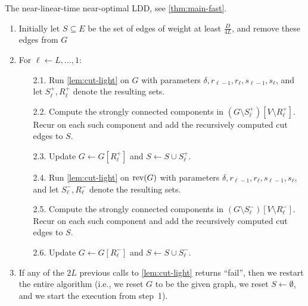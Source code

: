 \documentclass[letterpaper,11pt]{article}
\begin{document}
\begin{algorithm}[t]
\caption{The near-linear-time near-optimal LDD, see \cref{thm:main-fast}.} \label{alg:ldd-fast}
\begin{enumerate}
    \item Initially let $S \subseteq E$ be the set of edges of weight at least $\frac{D}{4L}$, and remove these edges from $G$
    \item For $\ell \gets L, \dots, 1$:
    \begin{enumerate}
        \item[2.1.] Run \cref{lem:cut-light} on $G$ with parameters $\delta, r_{\ell-1}, r_\ell, s_{\ell-1}, s_{\ell}$, and let $S^+_\ell, R^+_\ell$ denote the resulting sets.
        \item[2.2.] Compute the strongly connected components in $(G \setminus S^+_\ell)[V \setminus R^+_\ell]$. Recur on each such component and add the recursively computed cut edges to $S$.
        \item[2.3.] Update $G \gets G[R^+_\ell]$ and $S \gets S \cup S^+_\ell$.
        \item[2.4.] Run \cref{lem:cut-light} on $\operatorname{rev}(G)$ with parameters $\delta, r_{\ell-1}, r_\ell, s_{\ell-1}, s_{\ell}$, and let $S^-_\ell, R^-_\ell$ denote the resulting sets.
        \item[2.5.] Compute the strongly connected components in $(G \setminus S^-_\ell)[V \setminus R^-_\ell]$. Recur on each such component and add the recursively computed cut edges to $S$.
        \item[2.6.] Update $G \gets G[R^-_\ell]$ and $S \gets S \cup S^-_\ell$.
    \end{enumerate}
    \item If any of the $2L$ previous calls to \cref{lem:cut-light} returns ``fail'', then we restart the entire algorithm (i.e., we reset $G$ to be the given graph, we reset $S \gets \emptyset$, and we start the execution from step~1).
\end{enumerate}
\end{algorithm}
\end{document}
